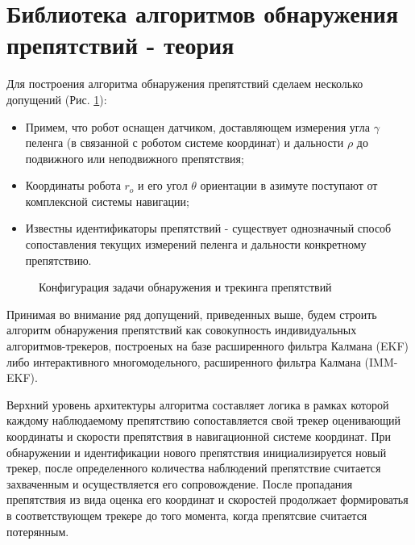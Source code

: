 \documentclass[14pt]{article}
\begin{document}
\section{Библиотека алгоритмов обнаружения препятствий - теория}
Для построения алгоритма обнаружения препятствий сделаем несколько допущений (Рис. \ref{fig:axes_tracker}):
\begin{itemize}
\item Примем, что робот оснащен датчиком, доставляющем измерения угла $\gamma$ пеленга (в связанной с роботом системе координат) и дальности $\rho$ до подвижного или неподвижного препятствия;
\item Координаты робота $r_o$ и его угол $\theta$ ориентации в азимуте  поступают от комплексной системы навигации;
\item Известны идентификаторы препятствий - существует однозначный способ сопоставления текущих измерений пеленга и дальности конкретному препятствию.
\end{itemize}

\begin{figure}
\noindent{}
\caption{Конфигурация задачи обнаружения и трекинга препятствий}
\label{fig:axes_tracker}
\end{figure}

Принимая во внимание ряд допущений, приведенных выше, будем строить алгоритм обнаружения препятствий как совокупность индивидуальных алгоритмов-трекеров, построеных на базе расширенного фильтра Калмана (EKF) либо интерактивного многомодельного, расширенного фильтра Калмана (IMM-EKF). 

Верхний уровень архитектуры алгоритма составляет логика в рамках которой каждому наблюдаемому препятствию сопоставляется свой трекер оценивающий координаты и скорости препятствия в навигационной системе координат. При обнаружении и идентификации нового препятствия инициализируется новый трекер, после определенного количества наблюдений препятствие считается захваченным и осуществляется его сопровождение. После пропадания препятствия из вида оценка его координат и скоростей продолжает формироватья в соответствующем трекере до того момента, когда препятсвие считается потерянным. 
\end{document}
